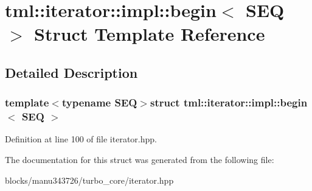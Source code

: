 \hypertarget{structtml_1_1iterator_1_1impl_1_1begin}{\section{tml\+:\+:iterator\+:\+:impl\+:\+:begin$<$ S\+E\+Q $>$ Struct Template Reference}
\label{structtml_1_1iterator_1_1impl_1_1begin}
}


\subsection{Detailed Description}
\subsubsection*{template$<$typename S\+E\+Q$>$struct tml\+::iterator\+::impl\+::begin$<$ S\+E\+Q $>$}



Definition at line 100 of file iterator.\+hpp.



The documentation for this struct was generated from the following file\+:\begin{DoxyCompactItemize}
\item 
blocks/manu343726/turbo\+\_\+core/iterator.\+hpp\end{DoxyCompactItemize}

